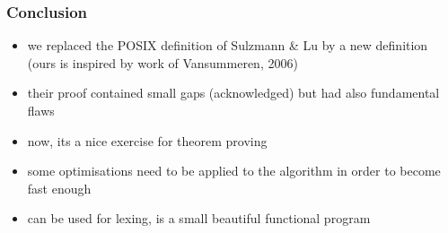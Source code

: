 \documentclass[dvipsnames,14pt,t]{beamer}
\begin{document}
\begin{frame}[c]
\frametitle{Conclusion}

\begin{itemize}

\item we replaced the POSIX definition of Sulzmann \& Lu by a
      new definition (ours is inspired by work of Vansummeren,
      2006)\medskip
  
\item their proof contained small gaps (acknowledged) but had
      also fundamental flaws\medskip

\item now, its a nice exercise for theorem proving\medskip

\item some optimisations need to be applied to the algorithm
      in order to become fast enough\medskip

\item can be used for lexing, is a small beautiful functional
      program
 
\end{itemize}

\end{frame}


\end{document}
